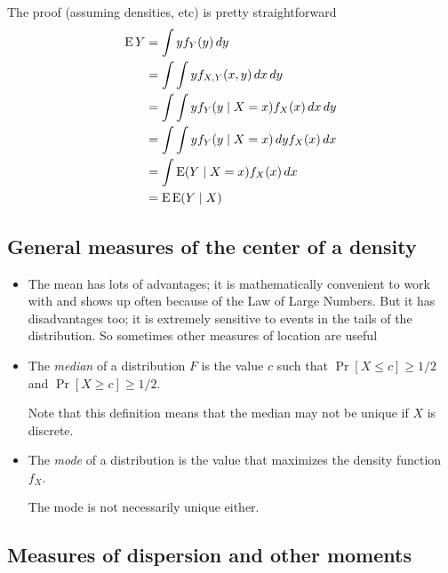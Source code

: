 \begin{itemize}
\begin{enumerate}
\begin{thm}
    \end{thm}
    The proof (assuming densities, etc) is pretty straightforward
    \begin{align*}
      \operatorname{E} Y &= \int y f_Y(y) \,dy \\
      &= \int \int y f_{X,Y}(x,y) \,dx \,dy \\
      &= \int \int y f_Y(y \mid X = x) f_X(x) \,dx \,dy \\
      &= \int \int y f_Y(y \mid X = x) \,dy f_X(x) \,dx \\
      &= \int \operatorname{E}(Y \mid X = x) f_X(x) \,dx \\
      &= \operatorname{E} \operatorname{E}(Y \mid X)
    \end{align*}
  \end{enumerate}

\end{itemize}

\subsection{General measures of the center of a density}

\begin{itemize}

\item The mean has lots of advantages; it is mathematically convenient
  to work with and shows up often because of the Law of Large Numbers.
  But it has disadvantages too; it is extremely sensitive to events in
  the tails of the distribution.  So sometimes other measures of
  location are useful

\item %
  \begin{defn}
    The \emph{median} of a distribution $F$ is the value $c$ such that
    $\Pr[X \leq c] \geq 1/2$ and $\Pr[X \geq c] \geq 1/2$.
  \end{defn}
  Note that this definition means that the median may not be unique if
  $X$ is discrete.

\item %
  \begin{defn}
    The \emph{mode} of a distribution is the value that maximizes
    the density function $f_X$.
  \end{defn}
  The mode is not necessarily unique either.

\end{itemize}

\subsection{Measures of dispersion and other moments}

